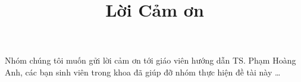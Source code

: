 
\begin{acknowledgements}
\title{Lời Cảm ơn}      


Nhóm chúng tôi muốn gửi lời cảm ơn tới giáo viên hướng dẫn TS. Phạm Hoàng Anh, các bạn sinh viên trong khoa đã giúp đỡ nhóm thực hiện đề tài này \dots

\end{acknowledgements}
